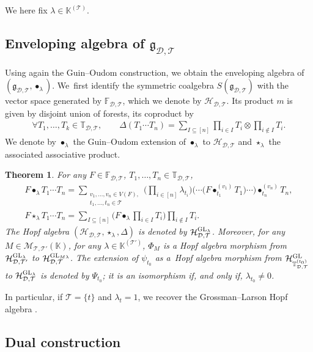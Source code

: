 \documentclass[10pt,a4paper]{amsart}
\numberwithin{equation}{section}
\newtheorem{Theorem}{Theorem}[section]
\newcommand{\K}{\mathbb{K}}
\newcommand{\T}{\mathcal{T}}
\newcommand{\D}{\mathcal{D}}
\newcommand{\g}{\mathfrak{g}}
\newcommand{\h}{\mathcal{H}}
\newcommand{\bfT}{\mathbb{T}}
\newcommand{\bfF}{\mathbb{F}}
\newcommand{\M}{\mathcal{M}}
\begin{document}
We here fix $\lambda\in \K^{(\T)}$.

\subsection[Enveloping algebra of g D,T]{Enveloping algebra of $\boldsymbol{\g_{\D,\T}}$}

Using again the Guin--Oudom construction, we obtain the enveloping algebra of $(\g_{\D,\T},\bullet_\lambda)$.
We~first identify the symmetric coalgebra $S(\g_{\D,\T})$ with the vector space generated by $\bfF_{\D,\T}$,
which we denote by $\h_{\D,\T}$.
Its product $m$ is given by disjoint union of forests, its coproduct by
\begin{gather*}
\forall T_1,\dots,T_k\in \bfT_{\D,\T},\qquad
\Delta(T_1\cdots T_n)=\sum_{I\subseteq [n]} \prod_{i\in I}T_i\otimes \prod_{i\notin I} T_i.
\end{gather*}
We denote by $\bullet_\lambda$ the Guin--Oudom extension of $\bullet_\lambda$ to $\h_{\D,\T}$ and $\star_\lambda$ the associated associative product.

\begin{Theorem}
For any $F\in \bfF_{\D,\T}$, $T_1,\dots,T_n \in \bfT_{\D,\T}$,
\begin{gather*}
F\bullet_\lambda T_1\cdots T_n=\sum_{\substack{v_1,\dots,v_n \in V(F),\\ t_1,\dots,t_n \in \T}}
\bigg(\prod_{i\in [n]} \lambda_{t_i}\bigg) \big(\cdots\big(F \bullet_{t_1}^{(v_1)}T_1\big)\cdots\big)\bullet_{t_n}^{(v_n)}T_n,
\\
F\star_\lambda T_1\cdots T_n=\sum_{I\subseteq [n]} \bigg(F\bullet_\lambda
\prod_{i\in I}T_i\bigg)\prod_{i\notin I} T_i.
\end{gather*}
The Hopf algebra $(\h_{\D,\T},\star_\lambda,\Delta)$ is denoted by $\h_{\D,\T}^{{\rm GL}_\lambda}$.
Moreover, for any $M\in \M_{\T,\T'}(\K)$, for any $\lambda\in \K^{(\T')}$,
$\Phi_M$ is a Hopf algebra morphism from $\h_{\D,\T'}^{{\rm GL}_\lambda}$ to $\h_{\D,\T}^{{\rm GL}_{M\lambda}}$.
The extension of $\psi_{t_0}$ as a~Hopf algebra morphism from $\h_{\bfT_{\D,\T}^{(t_0)}}^{{\rm GL}}$ to
$\h_{\D,\T}^{{\rm GL}_\lambda}$
is denoted by $\Psi_{t_0}$; it is an isomorphism if, and only if, $\lambda_{t_0}\neq 0$.
\end{Theorem}

In particular, if $\T=\{t\}$ and $\lambda_t=1$, we recover the Grossman--Larson Hopf algebra \cite{GrossmanLarson}.

\subsection{Dual construction}
\end{document}
